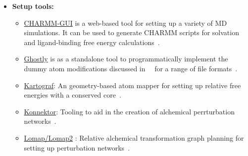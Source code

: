 \documentclass[9pt,bestpractices]{livecoms}
\begin{document}
\begin{itemize}
\begin{itemize}
    \item \href{https://github.com/choderalab/openmmtools}{OpenMMTools} provides tooling for creating alchemical simulations using OpenMM. These include tools for alchemically modifying OpenMM Systems, running multistate simulations and adding alchemical restraints~\cite{john_chodera_2025_17238654}.
	\item \href{https://www.plumed.org/}{PLUMED} is a tool which enables the usage of a variety of MD engines. It is designed as a plugin for MD packages such that it analyzes the trajectory on the fly. It also offers a VMD based plugin for the computation of collective variables~\cite{bonomi2019promoting}. 
	\item \href{http://pmx.mpibpc.mpg.de/instructions.html}{PMX}, an add-on to GROMACS, offers a mutation free energy calculation module~\cite{abraham2015gromacs}.
	\item \href{https://github.com/qusers/Q6}{Q} is MD code for performing FEP calculations using a variety of force fields~\cite{aaquist2017q6}. 
	\item \href{https://siremol.org/}{Sire} is a multiscale, molecular simulation framework that provides several applications, including SOMD, an MD/MC code for performing FEP calculations via an interface to OpenMM~\cite{woods2024sire}.
    \end{itemize}
\item[] \textbf{Setup tools:}
\begin{itemize}
    \item \href{http://www.charmm-gui.org/}{CHARMM-GUI} is a web-based tool for setting up a variety of MD simulations. It can be used to generate CHARMM scripts for solvation and ligand-binding free energy calculations~\cite{jo2008charmmgui}.
    \item \href{https://github.com/OpenBioSim/ghostly}{Ghostly} is as a standalone tool to programmatically implement the dummy atom modifications discussed in~\citeauthor{Fleck_2021}~\cite{Fleck_2021} for a range of file formats~\cite{hedges_ghostly_2025.2.0}.
    \item \href{https://github.com/OpenFreeEnergy/kartograf}
    {Kartograf}: An geometry-based atom mapper for setting up relative free energies with a conserved core~\cite{ries2024kartograf}.
    \item \href{https://github.com/OpenFreeEnergy/Konnektor}
    {Konnektor}: Tooling to aid in the creation of alchemical perrturbation networks~\cite{ries2024konnektor}. 
    \item \href{https://github.com/OpenFreeEnergy/Lomap}{Lomap/Lomap2} : Relative alchemical transformation graph planning for setting up perturbation networks~\cite{liu2013lead}.

\end{itemize}
\end{itemize}
\end{document}
